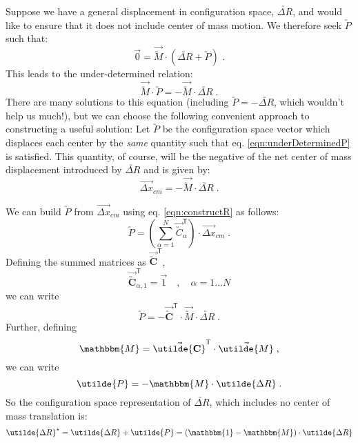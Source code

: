 \documentclass[letterpaper,12pt]{article}
\newcommand{\trans}[1]{{#1}^{\mathsf{T}}}
\newcommand{\scmat}[1]{\vec{\utilde{#1}}}
\newcommand{\cvec}[1]{\utilde{#1}}
\newcommand{\svec}[1]{\vec{#1}}
\newcommand{\refeq}[1]{eq. \ref{eqn:#1}}
\newcommand{\laeq}[1]{\label{eqn:#1}}
\begin{document}
Suppose we have a general displacement in configuration space, $\cvec{\Delta R}$, and would like to ensure that it does not include center of mass motion. We therefore seek $\cvec{P}$ such that:
\begin{equation}
\svec{0} = \scmat{M} \cdot \left( \cvec{\Delta R} + \cvec{P} \right) \; .
\end{equation}
This leads to the under-determined relation:
\begin{equation} \laeq{underDeterminedP}
\scmat{M} \cdot \cvec{P} = - \scmat{M} \cdot \cvec{\Delta R} \; .
\end{equation}
There are many solutions to this equation (including $\cvec{P} = - \cvec{\Delta R}$, which wouldn't help us much!), but we can choose the following convenient approach to constructing a useful solution: Let $\cvec{P}$ be the configuration space vector which displaces each center by the \emph{same} quantity such that \refeq{underDeterminedP} is satisfied. This quantity, of course, will be the negative of the net center of mass displacement introduced by $\cvec{\Delta R}$ and is given by:
\begin{equation}
\svec{\Delta x}_{cm} = - \scmat{M} \cdot \cvec{\Delta R} \; .
\end{equation}

We can build $\cvec{P}$ from $\svec{\Delta x}_{cm}$ using \refeq{constructR} as follows:
\begin{equation} \laeq{buildP}
\cvec{P} = \left( \sum_{\alpha = 1}^{N} \trans{\scmat{C}}_{\alpha} \right) \cdot \svec{\Delta x}_{cm} \; .
\end{equation}
Defining the summed matrices as $\trans{\scmat{\mathbf{C}}}$,
\begin{equation}\laeq{cComponents}
\trans{\scmat{\mathbf{C}}}_{\alpha,1} = \svec{1} \quad , \quad \alpha = 1 \ldots N
\end{equation}
 we can write
\begin{equation}
\cvec{P} = - \trans{\scmat{\mathbf{C}}} \cdot \scmat{M} \cdot \cvec{\Delta R} \; .
\end{equation}
Further, defining
\begin{equation} \laeq{bigMDefined}
\mathbbm{M} = \trans{\scmat{\mathbf{C}}} \cdot \scmat{M} \; ,
\end{equation}
we can write
\begin{equation}
\cvec{P} = -\mathbbm{M} \cdot \cvec{\Delta R} \; .
\end{equation}
So the configuration space representation of $\cvec{\Delta R}$, which includes no center of mass translation is:
\begin{equation}
\cvec{\Delta R}^{\star} = \cvec{\Delta R} + \cvec{P} = \left( \mathbbm{1} - \mathbbm{M} \right) \cdot \cvec{\Delta R}
\end{equation}
\end{document}
